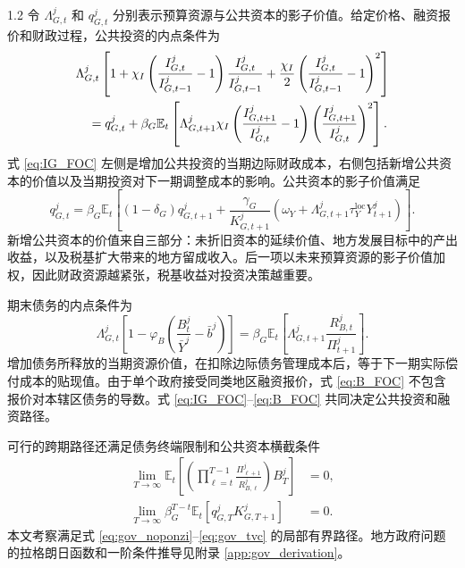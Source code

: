\documentclass[12pt,UTF8]{ctexart}
\newcommand{\E}{\mathbb{E}}
\begin{document}
\begin{spacing}{1.2}
		令 $\Lambda_{G,t}^j$ 和 $q_{G,t}^j$ 分别表示预算资源与公共资本的影子价值。给定价格、融资报价和财政过程，公共投资的内点条件为
		\begin{align}
			&\Lambda_{G,t}^j
			\left[
			1+\chi_I
			\left(
			\frac{I_{G,t}^j}{I_{G,t-1}^j}-1
			\right)
			\frac{I_{G,t}^j}{I_{G,t-1}^j}
			+\frac{\chi_I}{2}
			\left(
			\frac{I_{G,t}^j}{I_{G,t-1}^j}-1
			\right)^2
			\right] \notag\\
			&\quad =
			q_{G,t}^j
			+\beta_G \E_t
			\left[
			\Lambda_{G,t+1}^j\chi_I
			\left(
			\frac{I_{G,t+1}^j}{I_{G,t}^j}-1
			\right)
			\left(
			\frac{I_{G,t+1}^j}{I_{G,t}^j}
			\right)^2
			\right].
			\label{eq:IG_FOC}
		\end{align}
		式 \eqref{eq:IG_FOC} 左侧是增加公共投资的当期边际财政成本，右侧包括新增公共资本的价值以及当期投资对下一期调整成本的影响。公共资本的影子价值满足
		\begin{equation}
			q_{G,t}^j
			=
			\beta_G \E_t\left[
			(1-\delta_G)q_{G,t+1}^j
			+
			\frac{\gamma_G}{K_{G,t+1}^j}
			\left(
			\omega_Y+\Lambda_{G,t+1}^j\tau_Y^{\mathrm{loc}} Y_{t+1}^j
			\right)
			\right].
			\label{eq:QG_euler}
		\end{equation}
		新增公共资本的价值来自三部分：未折旧资本的延续价值、地方发展目标中的产出收益，以及税基扩大带来的地方留成收入。后一项以未来预算资源的影子价值加权，因此财政资源越紧张，税基收益对投资决策越重要。
		
		期末债务的内点条件为
		\begin{equation}
			\Lambda_{G,t}^j
			\left[
			1
			-\varphi_B
			\left(
			\frac{B_t^j}{\bar Y^j}-\bar b^j
			\right)
			\right]
			=
			\beta_G \E_t
			\left[
			\Lambda_{G,t+1}^j
			\frac{R_{B,t}^j}{\Pi_{t+1}^j}
			\right].
			\label{eq:B_FOC}
		\end{equation}
		增加债务所释放的当期资源价值，在扣除边际债务管理成本后，等于下一期实际偿付成本的贴现值。由于单个政府接受同类地区融资报价，式 \eqref{eq:B_FOC} 不包含报价对本辖区债务的导数。式 \eqref{eq:IG_FOC}--\eqref{eq:B_FOC} 共同决定公共投资和融资路径。
		
		可行的跨期路径还满足债务终端限制和公共资本横截条件
		\begin{align}
			\lim_{T\to\infty}\E_t\left[
			\left(\prod_{\ell=t}^{T-1}\frac{\Pi_{\ell+1}^j}{R_{B,\ell}^j}\right)B_T^j
			\right]&=0,
			\label{eq:gov_noponzi}\\
			\lim_{T\to\infty}\beta_G^{T-t}\E_t\left[q_{G,T}^jK_{G,T+1}^j\right]&=0.
			\label{eq:gov_tvc}
		\end{align}
		本文考察满足式 \eqref{eq:gov_noponzi}--\eqref{eq:gov_tvc} 的局部有界路径。地方政府问题的拉格朗日函数和一阶条件推导见附录 \ref{app:gov_derivation}。
		

\end{spacing}
\end{document}
